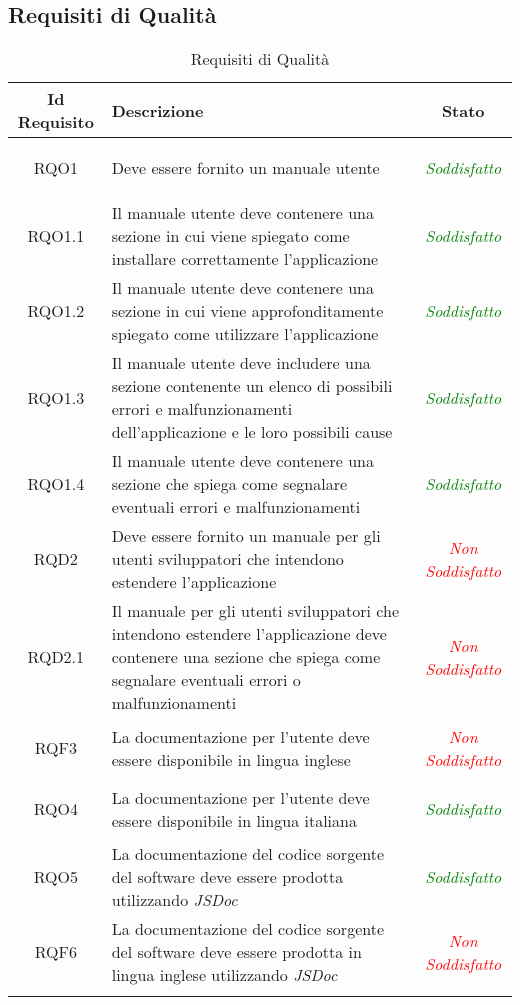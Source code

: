 \subsection{Requisiti di Qualità}
\normalsize
\begin{longtable}{|c|>{\centering}m{7cm}|c|}
\hline
\textbf{Id Requisito} & \textbf{Descrizione} & \textbf{Stato}\\
\hline
\endhead
\hypertarget{RQO1}{RQO1} & Deve essere fornito un manuale utente & \textcolor{Green}{\textit{Soddisfatto}}\\ \hline
\hypertarget{RQO1.1}{RQO1.1} & Il manuale utente deve contenere una sezione in cui viene spiegato come installare correttamente l'applicazione & \textcolor{Green}{\textit{Soddisfatto}}\\ \hline
\hypertarget{RQO1.2}{RQO1.2} & Il manuale utente deve contenere una sezione in cui viene approfonditamente spiegato come utilizzare l'applicazione & \textcolor{Green}{\textit{Soddisfatto}}\\ \hline
\hypertarget{RQO1.3}{RQO1.3} & Il manuale utente deve includere una sezione contenente un elenco di possibili errori e malfunzionamenti dell'applicazione e le loro possibili cause & \textcolor{Green}{\textit{Soddisfatto}}\\ \hline
\hypertarget{RQO1.4}{RQO1.4} & Il manuale utente deve contenere una sezione che spiega come segnalare eventuali errori e malfunzionamenti & \textcolor{Green}{\textit{Soddisfatto}}\\ \hline
\hypertarget{RQD2}{RQD2} & Deve essere fornito un manuale per gli utenti sviluppatori che intendono estendere l'applicazione & \textcolor{Red}{\textit{Non Soddisfatto}}\\ \hline
\hypertarget{RQD2.1}{RQD2.1} & Il manuale per gli utenti sviluppatori che intendono estendere l'applicazione deve contenere una sezione che spiega come segnalare eventuali errori o malfunzionamenti & \textcolor{Red}{\textit{Non Soddisfatto}}\\ \hline
\hypertarget{RQF3}{RQF3} & La documentazione per l'utente deve essere disponibile in lingua inglese & \textcolor{Red}{\textit{Non Soddisfatto}}\\ \hline
\hypertarget{RQO4}{RQO4} & La documentazione per l'utente deve essere disponibile in lingua italiana & \textcolor{Green}{\textit{Soddisfatto}}\\ \hline
\hypertarget{RQO5}{RQO5} & La documentazione del codice sorgente del software deve essere prodotta utilizzando \textit{JSDoc} & \textcolor{Green}{\textit{Soddisfatto}}\\ \hline
\hypertarget{RQF6}{RQF6} & La documentazione del codice sorgente del software deve essere prodotta in lingua inglese utilizzando \textit{JSDoc} & \textcolor{Red}{\textit{Non Soddisfatto}}\\ \hline
\caption[Requisiti di Qualità]{Requisiti di Qualità}
\label{tabella:req2}
\end{longtable}
\clearpage


